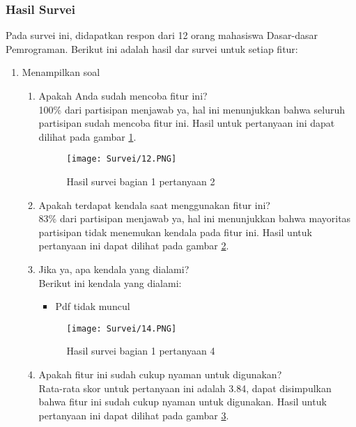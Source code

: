 \subsubsection{Hasil Survei}
Pada survei ini, didapatkan respon dari 12 orang mahasiswa Dasar-dasar Pemrograman. Berikut ini adalah hasil dar survei untuk setiap fitur:

\begin{enumerate}
    \item Menampilkan soal
    \begin{enumerate}
        \begin{figure}[H]
        	\centering  
        	\texttt{[image: Survei/11.PNG]}  
        	\caption{Hasil survei bagian 1 pertanyaan 1}
        	\label{fig:5:survei11} 
        \end{figure} 
        \item Apakah Anda sudah mencoba fitur ini? \\ 100\% dari partisipan menjawab ya, hal ini menunjukkan bahwa seluruh partisipan sudah mencoba fitur ini. Hasil untuk pertanyaan ini dapat dilihat pada gambar \ref{fig:5:survei11}.
        \begin{figure}[H]
        	\centering  
        	\texttt{[image: Survei/12.PNG]}  
        	\caption{Hasil survei bagian 1 pertanyaan 2}
        	\label{fig:5:survei12} 
        \end{figure} 
        \item Apakah terdapat kendala saat menggunakan fitur ini? \\ 83\% dari partisipan menjawab ya, hal ini menunjukkan bahwa mayoritas partisipan tidak menemukan kendala pada fitur ini. Hasil untuk pertanyaan ini dapat dilihat pada gambar \ref{fig:5:survei12}.
        \item Jika ya, apa kendala yang dialami? \\ Berikut ini kendala yang dialami:
        \begin{itemize}
            \item Pdf tidak muncul
        \end{itemize}
        \begin{figure}[H]
        	\centering  
        	\texttt{[image: Survei/14.PNG]}  
        	\caption{Hasil survei bagian 1 pertanyaan 4}
        	\label{fig:5:survei14} 
        \end{figure}
        \item Apakah fitur ini sudah cukup nyaman untuk digunakan? \\ Rata-rata skor untuk pertanyaan ini adalah 3.84, dapat disimpulkan bahwa fitur ini sudah cukup nyaman untuk digunakan. Hasil untuk pertanyaan ini dapat dilihat pada gambar \ref{fig:5:survei14}.

\end{enumerate}
\end{enumerate}

